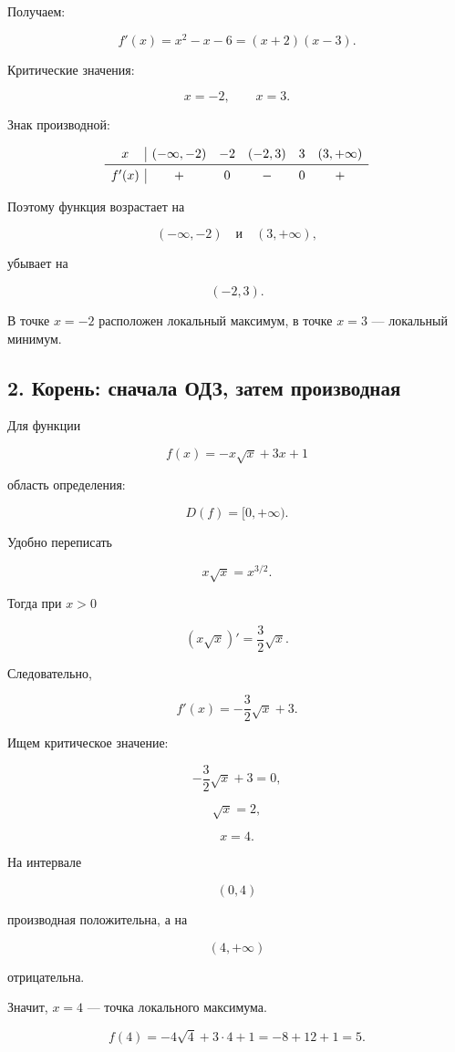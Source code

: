 \documentclass[a4paper,12pt]{article}
\begin{document}
Получаем:

\[
f'(x)
=
x^2-x-6
=
(x+2)(x-3).
\]

Критические значения:

\[
x=-2,
\qquad
x=3.
\]

Знак производной:

\[
\begin{array}{c|ccccc}
x
&
(-\infty,-2)
&
-2
&
(-2,3)
&
3
&
(3,+\infty)
\\
\midrule
f'(x)
&
+
&
0
&
-
&
0
&
+
\end{array}
\]

Поэтому функция возрастает на

\[
(-\infty,-2)
\quad\text{и}\quad
(3,+\infty),
\]

убывает на

\[
(-2,3).
\]

В точке \(x=-2\) расположен локальный максимум, в точке \(x=3\) --- локальный минимум.

\subsection*{2. Корень: сначала ОДЗ, затем производная}

Для функции

\[
f(x)
=
-x\sqrt{x}
+
3x
+
1
\]

область определения:

\[
D(f)=[0,+\infty).
\]

Удобно переписать

\[
x\sqrt{x}=x^{3/2}.
\]

Тогда при \(x>0\)

\[
(x\sqrt{x})'
=
\frac32\sqrt{x}.
\]

Следовательно,

\[
f'(x)
=
-\frac32\sqrt{x}
+
3.
\]

Ищем критическое значение:

\[
-\frac32\sqrt{x}+3=0,
\]

\[
\sqrt{x}=2,
\]

\[
x=4.
\]

На интервале

\[
(0,4)
\]

производная положительна, а на

\[
(4,+\infty)
\]

отрицательна.

Значит, \(x=4\) --- точка локального максимума.

\[
f(4)
=
-4\sqrt4+3\cdot4+1
=
-8+12+1
=
5.
\]
\end{document}
